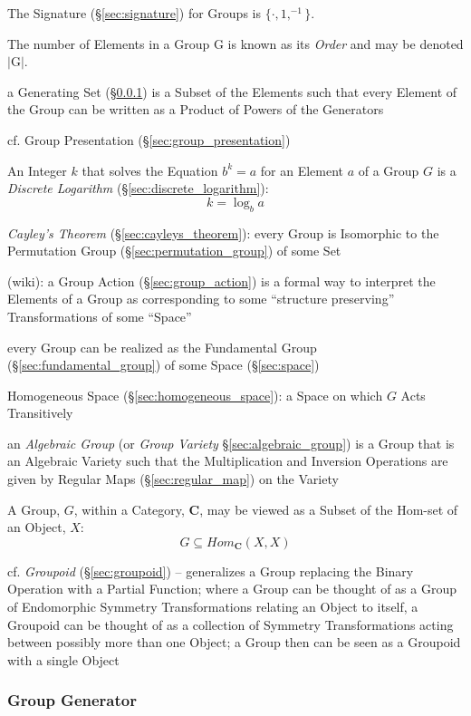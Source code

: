 The Signature (\S\ref{sec:signature}) for Groups is $\{\cdot, 1, ^{-1}\}$.

The number of Elements in a Group $\mathrm{G}$ is known as its \emph{Order} and
may be denoted $|\mathrm{G}|$.

a Generating Set (\S\ref{sec:group_generator}) is a Subset of the Elements such
that every Element of the Group can be written as a Product of Powers of the
Generators

\fist cf. Group Presentation (\S\ref{sec:group_presentation})

An Integer $k$ that solves the Equation $b^k = a$ for an Element $a$ of a Group
$G$ is a \emph{Discrete Logarithm} (\S\ref{sec:discrete_logarithm}):
\[
  k = \log_b a
\]

\emph{Cayley's Theorem} (\S\ref{sec:cayleys_theorem}): every Group is Isomorphic
to the Permutation Group (\S\ref{sec:permutation_group}) of some Set

(wiki): a Group Action (\S\ref{sec:group_action}) is a formal way to interpret
the Elements of a Group as corresponding to some ``structure preserving''
Transformations of some ``Space''

every Group can be realized as the Fundamental Group
(\S\ref{sec:fundamental_group}) of some Space (\S\ref{sec:space})

\fist Homogeneous Space (\S\ref{sec:homogeneous_space}): a Space on which $G$
Acts Transitively

\fist an \emph{Algebraic Group} (or \emph{Group Variety}
\S\ref{sec:algebraic_group}) is a Group that is an Algebraic Variety such that
the Multiplication and Inversion Operations are given by Regular Maps
(\S\ref{sec:regular_map}) on the Variety

A Group, $G$, within a Category, $\mathbf{C}$, may be viewed as a Subset of the
Hom-set of an Object, $X$:
\[
    G \subseteq Hom_{\mathbf{C}}(X,X)
\]

\fist cf. \emph{Groupoid} (\S\ref{sec:groupoid}) -- generalizes a Group
replacing the Binary Operation with a Partial Function; where a Group can be
thought of as a Group of Endomorphic Symmetry Transformations relating an Object
to itself, a Groupoid can be thought of as a collection of Symmetry
Transformations acting between possibly more than one Object; a Group then can
be seen as a Groupoid with a single Object



\subsubsection{Group Generator}\label{sec:group_generator}

